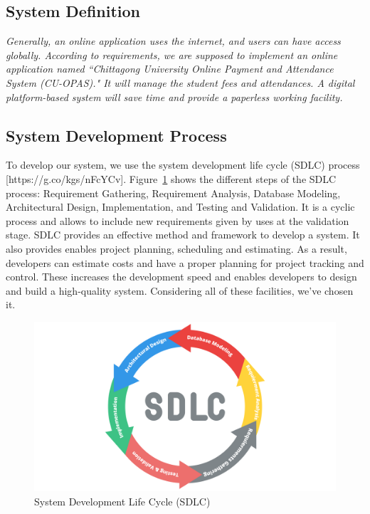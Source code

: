 \clearpage

\subsection{System Definition}\label{subsec:sd} 

\textit{Generally, an online application uses the internet, and users can have access globally. According to requirements, we are supposed to implement an online application named ``Chittagong University Online Payment and Attendance System (CU-OPAS)." It will manage the student fees and attendances. A digital platform-based system will save time and provide a paperless working facility.}


\subsection{System Development Process}\label{subsec:sdp}

To develop our system, we use the system development life cycle (SDLC) process [https://g.co/kgs/nFcYCv]. Figure~\ref{fig:sdlc} shows the different steps of the SDLC process: Requirement Gathering, Requirement Analysis, Database Modeling, Architectural Design, Implementation, and Testing and Validation. It is a cyclic process and allows to include new requirements given by uses at the validation stage. SDLC provides an effective method and framework to develop a system. It also provides enables project planning, scheduling and estimating. As a result, developers can estimate costs and have a proper planning for project tracking and control. These increases the development speed and enables developers to design and build a high-quality system. Considering all of these facilities, we've chosen it.

\begin{figure}[H]
    \centering
    \includegraphics[width=1\textwidth]{images/sdlc}
    \caption{System Development Life Cycle (SDLC)}
    \label{fig:sdlc}
\end{figure}

